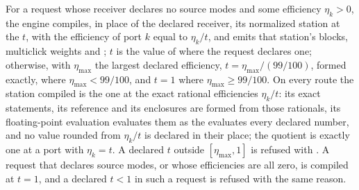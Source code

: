 \begin{requirement}\label{req:efficiency-normalization}
For a request whose receiver declares no source modes and some efficiency
$\eta_k>0$, the engine compiles, in place of the declared receiver, its
normalized station at the  $t$, with the efficiency of port $k$
equal to $\eta_k/t$, and emits that station's blocks, multiclick weights and
; $t$ is the value of 
where the request declares one; otherwise, with $\eta_{\max}$ the largest
declared efficiency, $t=\eta_{\max}/(99/100)$, formed exactly, where
$\eta_{\max}<99/100$, and $t=1$ where $\eta_{\max}\ge 99/100$. On every route the station compiled is the one at
the exact rational efficiencies $\eta_k/t$: its exact statements, its
reference and its enclosures are formed from those rationals, its
floating-point evaluation evaluates them as the 
evaluates every declared number, and no value rounded from $\eta_k/t$ is
declared in their place; the quotient is exactly one at a port with
$\eta_k=t$. A declared $t$ outside
$[\eta_{\max},1]$ is refused with
. A request that declares source
modes, or whose efficiencies are all zero, is compiled at $t=1$, and a
declared $t<1$ in such a request is refused with the same reason.
\end{requirement}
